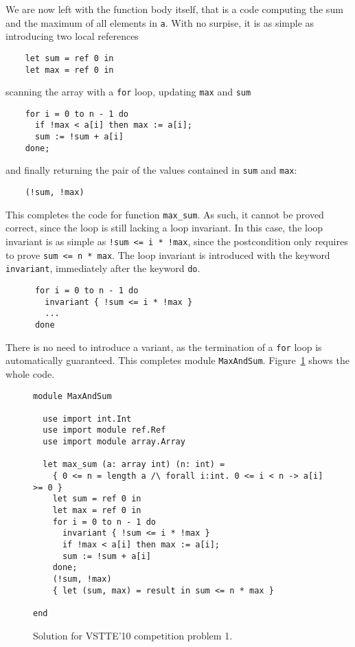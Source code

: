 We are now left with the function body itself, that is a code
computing the sum and the maximum of all elements in \texttt{a}. With
no surpise, it is as simple as introducing two local references
\begin{verbatim}
    let sum = ref 0 in
    let max = ref 0 in
\end{verbatim}
scanning the array with a \texttt{for} loop, updating \texttt{max}
and \texttt{sum}
\begin{verbatim}
    for i = 0 to n - 1 do
      if !max < a[i] then max := a[i];
      sum := !sum + a[i]
    done;
\end{verbatim}
and finally returning the pair of the values contained in \texttt{sum}
and \texttt{max}:
\begin{verbatim}
    (!sum, !max)
\end{verbatim}
This completes the code for function \texttt{max\_sum}.
As such, it cannot be proved correct, since the loop is still lacking
a loop invariant. In this case, the loop invariant is as simple as
\verb|!sum <= i * !max|, since the postcondition only requires to prove
\verb|sum <= n * max|. The loop invariant is introduced with the
keyword \texttt{invariant}, immediately after the keyword \texttt{do}.
\begin{verbatim}
      for i = 0 to n - 1 do
        invariant { !sum <= i * !max }
        ...
      done
\end{verbatim}
There is no need to introduce a variant, as the termination of a
\texttt{for} loop is automatically guaranteed.
This completes module \texttt{MaxAndSum}.
Figure~\ref{fig:MaxAndSum} shows the whole code.
\begin{figure}
  \centering
\begin{verbatim}
module MaxAndSum

  use import int.Int
  use import module ref.Ref
  use import module array.Array

  let max_sum (a: array int) (n: int) =
    { 0 <= n = length a /\ forall i:int. 0 <= i < n -> a[i] >= 0 }
    let sum = ref 0 in
    let max = ref 0 in
    for i = 0 to n - 1 do
      invariant { !sum <= i * !max }
      if !max < a[i] then max := a[i];
      sum := !sum + a[i]
    done;
    (!sum, !max)
    { let (sum, max) = result in sum <= n * max }

end
\end{verbatim}
\vspace*{-2em}\hrulefill
  \caption{Solution for VSTTE'10 competition problem 1.}
  \label{fig:MaxAndSum}
\end{figure}
